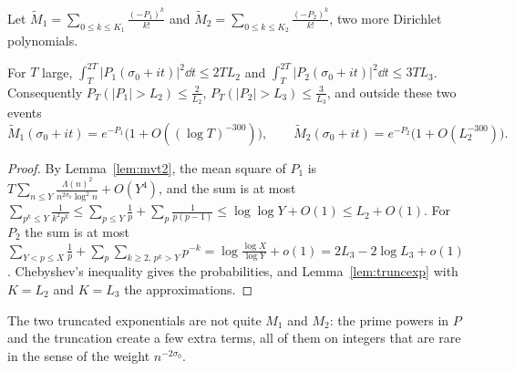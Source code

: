 Let $\widetilde M_1=\sum_{0\le k\le K_1}\frac{(-P_1)^k}{k!}$ and $\widetilde M_2=\sum_{0\le k\le K_2}\frac{(-P_2)^k}{k!}$, two more Dirichlet polynomials.

\begin{lemma}\label{lem:psmall}
For $T$ large, $\int_T^{2T}|P_1(\sigma_0+it)|^2\dd t\le2TL_2$ and $\int_T^{2T}|P_2(\sigma_0+it)|^2\dd t\le3TL_3$. Consequently $P_T(|P_1|>L_2)\le\frac2{L_2}$, $P_T(|P_2|>L_3)\le\frac3{L_3}$, and outside these two events
\[
\widetilde M_1(\sigma_0+it)=e^{-P_1}\bigl(1+O((\log T)^{-300})\bigr),\qquad\widetilde M_2(\sigma_0+it)=e^{-P_2}\bigl(1+O(L_2^{-300})\bigr).
\]
\end{lemma}
\begin{proof}
By Lemma~\ref{lem:mvt2}, the mean square of $P_1$ is $T\sum_{n\le Y}\frac{\Lambda(n)^2}{n^{2\sigma_0}\log^2n}+O(Y^4)$, and the sum is at most $\sum_{p^k\le Y}\frac1{k^2p^k}\le\sum_{p\le Y}\frac1p+\sum_p\frac1{p(p-1)}\le\log\log Y+O(1)\le L_2+O(1)$. For $P_2$ the sum is at most $\sum_{Y<p\le X}\frac1p+\sum_{p}\sum_{k\ge2,\,p^k>Y}p^{-k}=\log\frac{\log X}{\log Y}+o(1)=2L_3-2\log L_3+o(1)$. Chebyshev's inequality gives the probabilities, and Lemma~\ref{lem:truncexp} with $K=L_2$ and $K=L_3$ the approximations.
\end{proof}

The two truncated exponentials are not quite $M_1$ and $M_2$: the prime powers in $P$ and the truncation create a few extra terms, all of them on integers that are rare in the sense of the weight $n^{-2\sigma_0}$.

